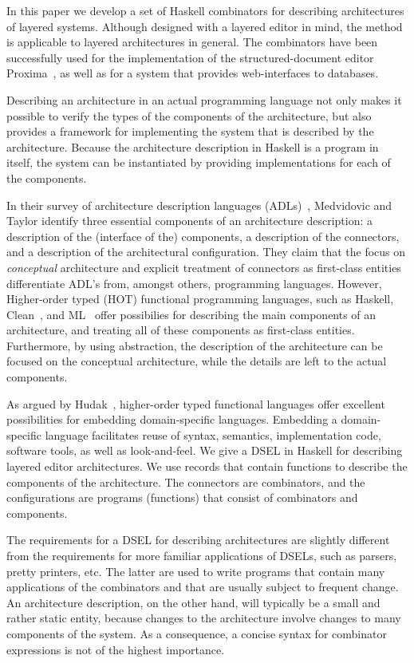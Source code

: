 \documentclass[preprint,natbib]{sigplanconf}
\begin{document}
In this paper we develop a set of Haskell combinators for describing architectures of layered systems. Although designed with a layered editor in mind, the method is applicable to layered architectures in general. The combinators have been successfully used for the implementation of the structured-document editor Proxima~\cite{Schrage04Proxima}, as well as for a system that provides web-interfaces to databases. 

Describing an architecture in an actual programming language not only makes it possible to verify the types of the components of the architecture, but also provides a framework for implementing the system that is described by the architecture. Because the architecture description in Haskell is a program in itself, the system can be instantiated by providing implementations for each of the components.

In their survey of architecture description languages (ADLs)~\cite{medvidovic00ADLs}, Medvidovic and Taylor identify three essential components of an architecture description: a description of the (interface of the) components, a description of the connectors, and a description of the architectural configuration. They claim that the focus on {\em conceptual} architecture and explicit treatment of connectors as first-class entities differentiate ADL's from, amongst others, programming languages. However, Higher-order typed (HOT) functional programming languages, such as Haskell, Clean~\cite{plasmeijer01clean}, and ML~\cite{milner97ML} offer possibilies for describing the main components of an architecture, and treating all of these components as first-class entities. Furthermore, by using abstraction, the description of the architecture can be focused on the conceptual architecture, while the details are left to the actual components.

As argued by Hudak~\cite{hudak98DSLs}, higher-order typed functional languages offer excellent possibilities for embedding domain-specific languages. Embedding a domain-specific language facilitates reuse of syntax, semantics, implementation code, software tools, as well as look-and-feel. We give a DSEL in Haskell for describing layered editor architectures. We use records that contain functions to describe the components of the architecture. The connectors are combinators, and the configurations are programs (functions) that consist of combinators and components. 

\bc
The requirements for a DSEL for describing architectures are slightly different from the requirements for more familiar applications of DSELs, such as parsers, pretty printers, etc. The latter are used to write programs that contain many applications of the combinators and that are usually subject to frequent change. An architecture description, on the other hand, will typically be a small and rather static entity, because changes to the architecture involve changes to many components of the system.  As a consequence, a concise syntax for combinator expressions is not of the highest importance.
\ec
\end{document}
